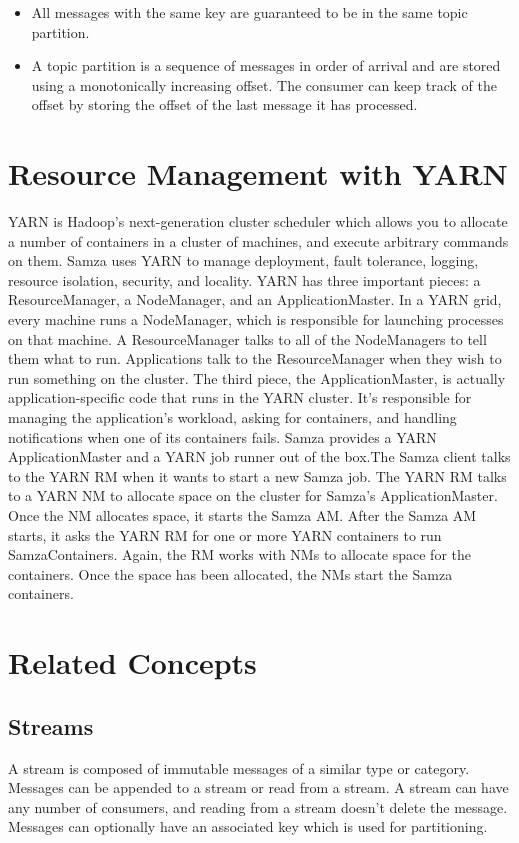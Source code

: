 \documentclass[9pt,twocolumn,twoside]{../../styles/osajnl}
\begin{document}
\begin{itemize}
\renewcommand{\labelitemi}{\scriptsize$\square$} 
\item All messages with the same key are guaranteed to be in the same topic partition.
\item A topic partition is a sequence of messages in order of arrival and are stored
using a monotonically increasing offset. The consumer can keep track of the
offset by storing the offset of the last message it has processed. 
\end{itemize}

\section{Resource Management with YARN}
YARN is Hadoop’s next-generation cluster scheduler which allows you to allocate
a number of containers in a cluster of machines, and execute arbitrary commands
on them. Samza uses YARN to manage deployment, fault tolerance, logging,
resource isolation, security, and locality. YARN has three important pieces: a
ResourceManager, a NodeManager, and an ApplicationMaster. In a YARN grid, every
machine runs a NodeManager, which is responsible for launching processes on that
machine. A ResourceManager talks to all of the NodeManagers to tell them what to
run. Applications talk to the ResourceManager when they wish to run something on
the cluster. The third piece, the ApplicationMaster, is actually
application-specific code that runs in the YARN cluster. It’s responsible for
managing the application’s workload, asking for containers, and handling
notifications when one of its containers fails.\cite{paper3}
Samza provides a YARN ApplicationMaster and a YARN job runner out of the box.The
Samza client talks to the YARN RM when it wants to start a new Samza job. The
YARN RM talks to a YARN NM to allocate space on the cluster for Samza’s
ApplicationMaster. Once the NM allocates space, it starts the Samza AM. After
the Samza AM starts, it asks the YARN RM for one or more YARN containers to run
SamzaContainers. Again, the RM works with NMs to allocate space for the
containers. Once the space has been allocated, the NMs start the Samza
containers.\cite{paper4}

\section{Related Concepts}

\subsection{Streams}
A stream is composed of immutable messages of a similar type or category.
Messages can be appended to a stream or read from a stream. A stream can have
any number of consumers, and reading from a stream doesn’t delete the message.
Messages can optionally have an associated key which is used for partitioning.
\cite{www-samza}
\end{document}
